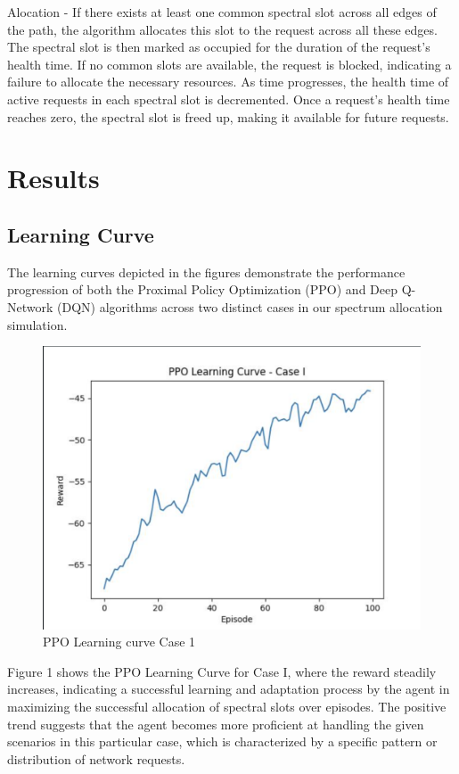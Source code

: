 \documentclass[conference]{IEEEtran}
\begin{document}
Alocation - If there exists at least one common spectral slot across all edges of the path, the algorithm allocates this slot to the request across all these edges. The spectral slot is then marked as occupied for the duration of the request's health time. If no common slots are available, the request is blocked, indicating a failure to allocate the necessary resources.
As time progresses, the health time of active requests in each spectral slot is decremented. Once a request's health time reaches zero, the spectral slot is freed up, making it available for future requests.



\section{Results}
\subsection{Learning Curve}

The learning curves depicted in the figures demonstrate the performance progression of both the Proximal Policy Optimization (PPO) and Deep Q-Network (DQN) algorithms across two distinct cases in our spectrum allocation simulation.

\begin{figure}[H]
    \centering
    \includegraphics[width=0.5\linewidth]{Fig 1.png}
    \caption{PPO Learning curve Case 1}
    \label{fig:enter-label}
\end{figure}

Figure 1 shows the PPO Learning Curve for Case I, where the reward steadily increases, indicating a successful learning and adaptation process by the agent in maximizing the successful allocation of spectral slots over episodes. The positive trend suggests that the agent becomes more proficient at handling the given scenarios in this particular case, which is characterized by a specific pattern or distribution of network requests.
\end{document}
